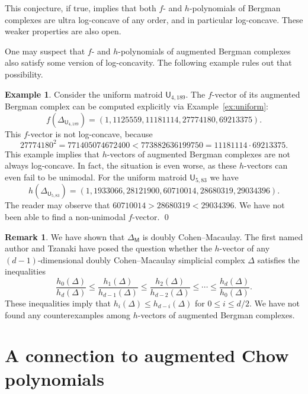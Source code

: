 \documentclass[11pt]{amsart}
\theoremstyle{theorems}
\theoremstyle{definition}
\newtheorem{example}[theorem]{Example}
\newtheorem{remark}[theorem]{Remark}
\newcommand{\M}{{\mathsf{M}}}
\newcommand{\U}{{\mathsf{U}}}
\begin{document}
This conjecture, if true, implies that both $f$- and 
$h$-polynomials of Bergman complexes are ultra log-concave 
of any order, and in particular log-concave. These weaker 
properties are also open. 

One may suspect that $f$- and $h$-polynomials of augmented 
Bergman complexes also satisfy some version of log-concavity.
The following example rules out that possibility.

\begin{example}
Consider the uniform matroid $\U_{4,189}$. The $f$-vector 
of its augmented Bergman complex can be computed explicitly 
via Example~\ref{ex:uniform}:
%
\[ f(\Delta_{\U_{4,189}}) = (1, 1125559, 11181114, 27774180, 
                             69213375).\]
%
This $f$-vector is not log-concave, because
%
\[ 27774180^2 = 771405074672400  < 773882636199750 = 11181114 
   \cdot 69213375. \]
%
This example implies that $h$-vectors of augmented Bergman 
complexes are not always log-concave. In fact, the situation 
is even worse, as these $h$-vectors can even fail to be 
unimodal. For the uniform matroid $\U_{5,83}$ we have
%
\[ h(\Delta_{\U_{5,83}}) = (1, 1933066, 28121900, 60710014, 
                            28680319, 29034396).\]
%
The reader may observe that $60710014 > 28680319 < 29034396$. 
We have not been able to find a non-unimodal $f$-vector.
\qed
\end{example}


\begin{remark}
We have shown that $\Delta_{\M}$ is doubly Cohen--Macaulay. 
The first named author and Tzanaki have posed the question 
\cite[Question~7.2]{AT21} whether the $h$-vector of any 
$(d-1)$-dimensional doubly Cohen--Macaulay simplicial 
complex $\Delta$ satisfies the inequalities
%
\begin{equation}\label{eq:ineq-2cm}
\frac{h_0(\Delta)}{h_{d}(\Delta)} \le \frac{h_1(\Delta)}
     {h_{d-1}(\Delta)} \le \frac{h_2(\Delta)}{h_{d-2}(\Delta)} 
		 \le \cdots \le \frac{h_d(\Delta)}{h_{0}(\Delta)}.
\end{equation}
%
These inequalities imply that $h_i(\Delta) \le h_{d-i}
(\Delta)$ for $0 \le i \le d/2$. We have not found any 
counterexamples among $h$-vectors of augmented Bergman 
complexes. 
\end{remark}

\section{A connection to augmented Chow polynomials}
\label{sec:chow}
\end{document}
